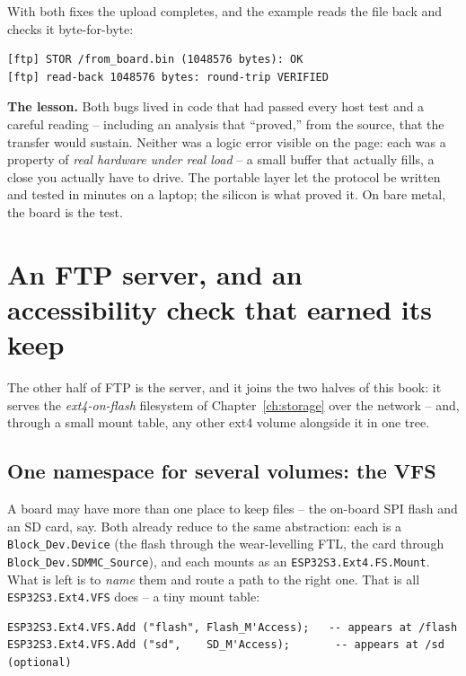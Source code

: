 With both fixes the upload completes, and the example reads the file back and
checks it byte-for-byte:

\begin{lstlisting}[style=sh]
[ftp] STOR /from_board.bin (1048576 bytes): OK
[ftp] read-back 1048576 bytes: round-trip VERIFIED
\end{lstlisting}

\textbf{The lesson.} Both bugs lived in code that had passed every host test and a
careful reading -- including an analysis that ``proved,'' from the source, that
the transfer would sustain. Neither was a logic error visible on the page: each was
a property of \emph{real hardware under real load} -- a small buffer that actually
fills, a close you actually have to drive. The portable layer let the protocol be
written and tested in minutes on a laptop; the silicon is what proved it. On bare
metal, the board is the test.

\section{An FTP server, and an accessibility check that earned its keep}
\label{ch:net:ftpd}

The other half of FTP is the server, and it joins the two halves of this book: it
serves the \emph{ext4-on-flash} filesystem of Chapter~\ref{ch:storage} over the
network -- and, through a small mount table, any other ext4 volume alongside it in
one tree.

\subsection{One namespace for several volumes: the VFS}
\label{ch:net:vfs}

A board may have more than one place to keep files -- the on-board SPI flash and
an SD card, say. Both already reduce to the same abstraction: each is a
\texttt{Block\_Dev.Device} (the flash through the wear-levelling FTL, the card
through \texttt{Block\_Dev.SDMMC\_Source}), and each mounts as an
\texttt{ESP32S3.Ext4.FS.Mount}. What is left is to \emph{name} them and route a path
to the right one. That is all \texttt{ESP32S3.Ext4.VFS} does -- a tiny mount table:

\begin{lstlisting}
ESP32S3.Ext4.VFS.Add ("flash", Flash_M'Access);   -- appears at /flash
ESP32S3.Ext4.VFS.Add ("sd",    SD_M'Access);       -- appears at /sd   (optional)
\end{lstlisting}

